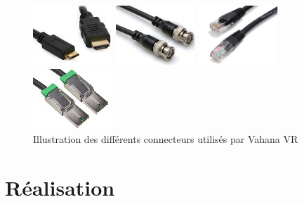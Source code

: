 \begin{figure}
  \centering
  \begin{minipage}{0.2\textwidth}
    \centering
    \includegraphics[width=3cm]{images/hdmi-cable.jpg}
  \end{minipage}%
  \hspace{0.03\textwidth}
  \begin{minipage}{0.2\textwidth}
    \centering
    \includegraphics[width=3cm]{images/sdi-cable.jpg}
  \end{minipage}%
  \hspace{0.03\textwidth}
  \begin{minipage}{0.2\textwidth}
    \centering
    \includegraphics[width=3cm]{images/ethernet-cable.jpg}
  \end{minipage}%
  \hspace{0.03\textwidth}
  \begin{minipage}{0.2\textwidth}
    \centering
    \includegraphics[width=3cm]{images/pcie-cable.jpg}
  \end{minipage}
  \caption{Illustration des différents connecteurs utilisés par Vahana VR}
\end{figure}


\section{Réalisation}
